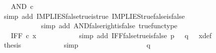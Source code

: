 \begin{isabellebody}
\ {\isachardoublequoteopen}{\isachardot}{\kern0pt}{\isachardot}{\kern0pt}{\isachardot}{\kern0pt}\ {\isacharequal}{\kern0pt}\ AND\ {\isasymcirc}\isactrlsub c\ {\isasymlangle}{\isasymt}{\isacharcomma}{\kern0pt}\ {\isasymf}{\isasymrangle}{\isachardoublequoteclose}\isanewline
\ \ \ \ \ \ \ \ \ \ \isamarkupfalse%
\ {\isacharparenleft}{\kern0pt}simp\ add{\isacharcolon}{\kern0pt}\ IMPLIES{\isacharunderscore}{\kern0pt}false{\isacharunderscore}{\kern0pt}true{\isacharunderscore}{\kern0pt}is{\isacharunderscore}{\kern0pt}true\ IMPLIES{\isacharunderscore}{\kern0pt}true{\isacharunderscore}{\kern0pt}false{\isacharunderscore}{\kern0pt}is{\isacharunderscore}{\kern0pt}false{\isacharparenright}{\kern0pt}\isanewline
\ \ \ \ \ \ \ \ \isamarkupfalse%
\ \isamarkupfalse%
\ {\isachardoublequoteopen}{\isachardot}{\kern0pt}{\isachardot}{\kern0pt}{\isachardot}{\kern0pt}\ {\isacharequal}{\kern0pt}\ {\isasymf}{\isachardoublequoteclose}\isanewline
\ \ \ \ \ \ \ \ \ \ \isamarkupfalse%
\ {\isacharparenleft}{\kern0pt}simp\ add{\isacharcolon}{\kern0pt}\ AND{\isacharunderscore}{\kern0pt}false{\isacharunderscore}{\kern0pt}right{\isacharunderscore}{\kern0pt}is{\isacharunderscore}{\kern0pt}false\ true{\isacharunderscore}{\kern0pt}func{\isacharunderscore}{\kern0pt}type{\isacharparenright}{\kern0pt}\isanewline
\ \ \ \ \ \ \ \ \isamarkupfalse%
\ \isamarkupfalse%
\ {\isachardoublequoteopen}{\isachardot}{\kern0pt}{\isachardot}{\kern0pt}{\isachardot}{\kern0pt}\ {\isacharequal}{\kern0pt}\ IFF\ {\isasymcirc}\isactrlsub c\ x{\isachardoublequoteclose}\isanewline
\ \ \ \ \ \ \ \ \ \ \isamarkupfalse%
\ {\isacharparenleft}{\kern0pt}simp\ add{\isacharcolon}{\kern0pt}\ IFF{\isacharunderscore}{\kern0pt}false{\isacharunderscore}{\kern0pt}true{\isacharunderscore}{\kern0pt}is{\isacharunderscore}{\kern0pt}false\ {\isacartoucheopen}p\ {\isacharequal}{\kern0pt}\ {\isasymf}{\isacartoucheclose}\ {\isacartoucheopen}q\ {\isacharequal}{\kern0pt}\ {\isasymt}{\isacartoucheclose}\ x{\isacharunderscore}{\kern0pt}def{\isacharparenright}{\kern0pt}\isanewline
\ \ \ \ \ \ \ \ \isamarkupfalse%
\ \isamarkupfalse%
\ {\isacharquery}{\kern0pt}thesis\isanewline
\ \ \ \ \ \ \ \ \ \ \isamarkupfalse%
\ simp\isanewline
\ \ \ \ \ \ \isamarkupfalse%
\isanewline
\ \ \ \ \isamarkupfalse%
\isanewline
\ \ \ \ \ \ \isamarkupfalse%
\ {\isachardoublequoteopen}q\ {\isasymnoteq}\ {\isasymt}{\isachardoublequoteclose}\isanewline
\ \ \ \ \ \ \isamarkupfalse%

\end{isabellebody}
